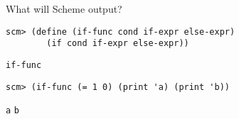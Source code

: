 \begin{blocksection}

\question What will Scheme output?


\begin{lstlisting}
scm> (define (if-func cond if-expr else-expr)
		(if cond if-expr else-expr))
\end{lstlisting}
\begin{solution}[.25in]
\texttt{if-func}
\end{solution}

\begin{lstlisting}
scm> (if-func (= 1 0) (print 'a) (print 'b))
\end{lstlisting}
\begin{solution}[.25in]
\texttt{a}
\newline
\texttt{b}
\end{solution}

\end{blocksection}
